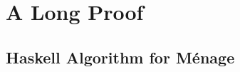 \section{A Long Proof}
\label{app:long_proof}

\subsection{Haskell Algorithm for M\'enage}


\Blindtext[1]
